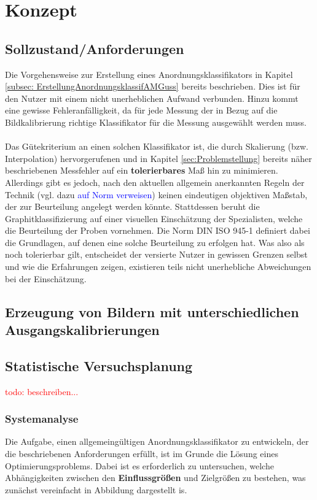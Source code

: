 \documentclass[
fontsize=10pt, 
listof = totoc,
parskip = half	
]{report}
\begin{document}
\chapter{Konzept}
\label{ch:Konzept}

\section{Sollzustand/Anforderungen}
\label{sec:DefAnforderungenAnordnKlas}
Die Vorgehensweise zur Erstellung eines Anordnungsklassifikators in Kapitel \ref{subsec: ErstellungAnordnungsklassifAMGuss} bereits beschrieben. Dies ist für den Nutzer mit einem nicht unerheblichen Aufwand verbunden. Hinzu kommt eine gewisse Fehleranfälligkeit, da für jede Messung der in Bezug auf die Bildkalibrierung richtige Klassifikator für die Messung ausgewählt werden muss.
\\\\
\noindent Das Gütekriterium an einen solchen Klassifikator ist, die durch Skalierung (bzw. Interpolation) hervorgerufenen und in Kapitel \ref{sec:Problemstellung} bereits näher beschriebenen Messfehler auf ein \textbf{tolerierbares} Maß hin zu minimieren. Allerdings gibt es jedoch, nach den aktuellen allgemein anerkannten Regeln der Technik (vgl. dazu \textcolor{blue}{auf Norm verweisen}) keinen eindeutigen objektiven Maßstab, der zur Beurteilung angelegt werden könnte. Stattdessen beruht die Graphitklassifizierung auf einer visuellen Einschätzung der Spezialisten, welche die Beurteilung der Proben vornehmen. Die Norm DIN ISO 945-1 definiert dabei die Grundlagen, auf denen eine solche Beurteilung zu erfolgen hat. Was also als noch tolerierbar gilt, entscheidet der versierte Nutzer in gewissen Grenzen selbst und wie die Erfahrungen zeigen, existieren teils nicht unerhebliche Abweichungen bei der Einschätzung. 

\section{Erzeugung von Bildern mit unterschiedlichen Ausgangskalibrierungen}


\section{Statistische Versuchsplanung}


\noindent\textcolor{red}{todo:  beschreiben...}  

\subsection{Systemanalyse}
Die Aufgabe, einen allgemeingültigen Anordnungsklassifikator zu entwickeln, der die beschriebenen Anforderungen erfüllt, ist im Grunde die Lösung eines Optimierungsproblems. Dabei ist es erforderlich zu untersuchen, welche Abhängigkeiten zwischen den \textbf{Einflussgrößen} und Zielgrößen zu bestehen, was zunächst vereinfacht in Abbildung dargestellt is.
       
\end{document}
